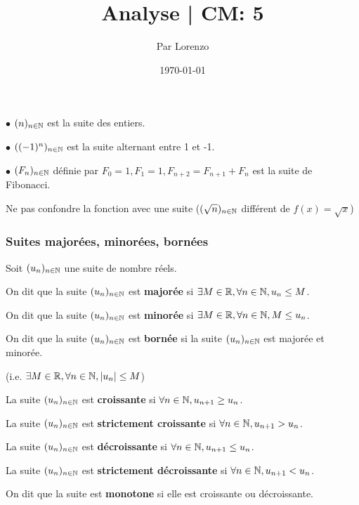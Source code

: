 \documentclass[a4paper, 12pt]{article}
\title{Analyse | CM: 5}
\author{Par Lorenzo}
\date{\today}
\begin{document}
\maketitle

\begin{example}
    \item $\bullet$ $(n)_{n \in \mathbb{N}}$ est la suite des entiers.
    \item $\bullet$ $((-1)^n)_{n \in \mathbb{N}}$ est la suite alternant entre 1 et -1.
    \item $\bullet$ $(F_n)_{n \in \mathbb{N}}$ définie par $F_0=1, F_1=1, F_{n+2}=F_{n+1}+F_n$
    est la suite de Fibonacci.
\end{example}

\begin{remark}
    Ne pas confondre la fonction avec une suite ($(\sqrt{n})_{n \in \mathbb{N}}$ différent de $f(x)= \sqrt{x}$)
\end{remark}

\subsubsection{Suites majorées, minorées, bornées}

\begin{definition}
    Soit $(u_n)_{n \in \mathbb{N}}$ une suite de nombre réels.
    
    \item On dit que la suite $(u_n)_{n \in \mathbb{N}}$ est
    \textbf{majorée} si $\exists M \in \mathbb{R}, \forall n \in \mathbb{N}, u_n \leq M$.
    
    \item On dit que la suite $(u_n)_{n \in \mathbb{N}}$ est
    \textbf{minorée} si $\exists M \in \mathbb{R}, \forall n \in \mathbb{N}, M \leq u_n$.

    \item On dit que la suite $(u_n)_{n \in \mathbb{N}}$ est
    \textbf{bornée} si la suite $(u_n)_{n \in \mathbb{N}}$ est majorée et minorée.\par
    (i.e. $\exists M \in \mathbb{R}, \forall n \in \mathbb{N}, |u_n| \leq M$)
\end{definition}

\begin{definition}
    \item La suite $(u_n)_{n \in \mathbb{N}}$ est \textbf{croissante} si $\forall n \in \mathbb{N}, u_{n+1} \geq  u_n$.
    
    \item La suite $(u_n)_{n \in \mathbb{N}}$ est \textbf{strictement croissante} si $\forall n \in \mathbb{N}, u_{n+1} >  u_n$.
    
    \item La suite $(u_n)_{n \in \mathbb{N}}$ est \textbf{décroissante} si $\forall n \in \mathbb{N}, u_{n+1} \leq  u_n$.

    \item La suite $(u_n)_{n \in \mathbb{N}}$ est \textbf{strictement décroissante} si $\forall n \in \mathbb{N}, u_{n+1} <  u_n$.

    \item On dit que la suite est \textbf{monotone} si elle est croissante ou décroissante.
\end{definition}
\end{document}
